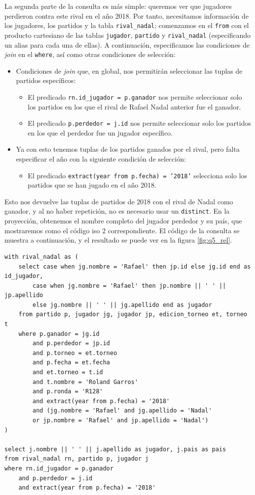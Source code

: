 La segunda parte de la consulta es más simple: queremos ver que jugadores perdieron contra este rival en el año 2018. Por tanto, necesitamos información de los jugadores, los partidos y la tabla \texttt{rival\_nadal}; comenzamos en el \texttt{from} con el producto cartesiano de las tablas \texttt{jugador}, \texttt{partido} y \texttt{rival\_nadal} (especificando un alias para cada una de ellas). A continuación, especificamos las condiciones de \textit{join} en el \texttt{where}, así como otras condiciones de selección:
\begin{itemize}
\item Condiciones de \textit{join} que, en global, nos permitirán seleccionar las tuplas de partidos específicos:
\begin{itemize}
\item El predicado \texttt{rn.id\_jugador = p.ganador} nos permite seleccionar solo los partidos en los que el rival de Rafael Nadal anterior fue el ganador.
\item El predicado \texttt{p.perdedor = j.id} nos permite seleccionar solo los partidos en los que el perdedor fue un jugador específico.
\end{itemize}
\item Ya con esto tenemos tuplas de los partidos ganados por el rival, pero falta especificar el año con la siguiente condición de selección: 
\begin{itemize}
\item El predicado \texttt{extract(year from p.fecha) = '2018'} selecciona solo los partidos que se han jugado en el año 2018.
\end{itemize}
\end{itemize}

Esto nos devuelve las tuplas de partidos de 2018 con el rival de Nadal como ganador, y al no haber repetición, no es necesario usar un \texttt{distinct}. En la proyección, obtenemos el nombre completo del jugador perdedor y su país, que mostraremos como el código iso 2 correspondiente. El código de la consulta se muestra a continuación, y el resultado se puede ver en la figura \ref{fig:q5_rel}.

\begin{verbatim}
with rival_nadal as (
	select case when jg.nombre = 'Rafael' then jp.id else jg.id end as id_jugador, 
		case when jg.nombre = 'Rafael' then jp.nombre || ' ' || jp.apellido 
		else jg.nombre || ' ' || jg.apellido end as jugador
	from partido p, jugador jg, jugador jp, edicion_torneo et, torneo t
	where p.ganador = jg.id 
		and p.perdedor = jp.id
		and p.torneo = et.torneo 
		and p.fecha = et.fecha
		and et.torneo = t.id 
		and t.nombre = 'Roland Garros'
		and p.ronda = 'R128'
		and extract(year from p.fecha) = '2018'
		and (jg.nombre = 'Rafael' and jg.apellido = 'Nadal' 
		or jp.nombre = 'Rafael' and jp.apellido = 'Nadal') 
)

select j.nombre || ' ' || j.apellido as jugador, j.pais as pais
from rival_nadal rn, partido p, jugador j
where rn.id_jugador = p.ganador 
	and p.perdedor = j.id
	and extract(year from p.fecha) = '2018'
\end{verbatim}

